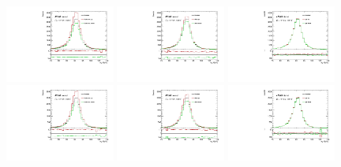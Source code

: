 \begin{figure}
\centering
\includegraphics[width=0.32\textwidth]{figures/appendix/ZHFSys/Zmm_scale.pdf} 
\includegraphics[width=0.32\textwidth]{figures/appendix/ZHFSys/Zmm_ckkw.pdf}
\includegraphics[width=0.32\textwidth]{figures/appendix/ZHFSys/Zmm_qsf.pdf} \\
\includegraphics[width=0.32\textwidth]{figures/appendix/ZHFSys/Zee_scale.pdf} 
\includegraphics[width=0.32\textwidth]{figures/appendix/ZHFSys/Zee_ckkw.pdf}
\includegraphics[width=0.32\textwidth]{figures/appendix/ZHFSys/Zee_qsf.pdf} \\ 

\end{figure}

